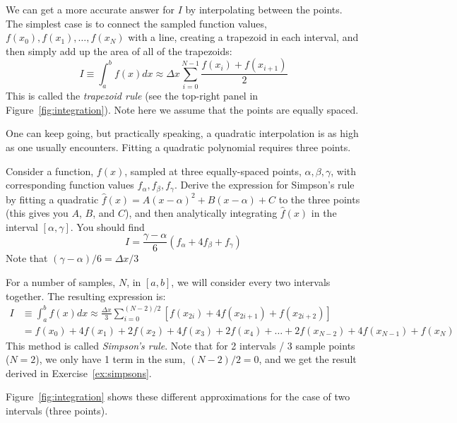 We can get a more accurate answer for $I$ by interpolating between the
points.  The simplest case is to connect the sampled function values,
$f(x_0), f(x_1), \ldots, f(x_N)$ with a line, creating a trapezoid in
each interval, and then simply add up the area of all of the
trapezoids:
\begin{equation}
I \equiv \int_a^b f(x) dx \approx
  \Delta x \sum_{i = 0}^{N-1} \frac{f(x_i) + f(x_{i+1})}{2}
\end{equation}
This is called the {\em trapezoid rule} (see the top-right panel in
Figure~\ref{fig:integration}).  Note here we assume that the points
are equally spaced.

One can keep going, but practically speaking, a quadratic interpolation
is as high as one usually encounters.  Fitting a quadratic polynomial
requires three points.

\begin{exercise}
\label{ex:simpsons}
Consider a function, $f(x)$, sampled at three equally-spaced points,
$\alpha, \beta, \gamma$, with corresponding function values $f_\alpha,
f_\beta, f_\gamma$.  Derive the expression for Simpson's rule by
fitting a quadratic $\hat{f}(x) = A(x - \alpha)^2 + B(x - \alpha) + C$
to the three points (this gives you $A$, $B$, and $C$), and then
analytically integrating $\hat{f}(x)$ in the interval
$[\alpha,\gamma]$.  You should find
\begin{equation}
I = \frac{\gamma-\alpha}{6} (f_\alpha + 4f_\beta + f_\gamma)
\end{equation}
Note that $(\gamma-\alpha)/6 = \Delta x/3$
\end{exercise}

For a number of samples, $N$, in $[a,b]$, we will
consider every two intervals together.  The resulting expression is:
\begin{align}
I &\equiv \int_a^b f(x) dx
\approx  \frac{\Delta x}{3} \sum_{i = 0}^{(N-2)/2} \left [f(x_{2i}) + 4 f(x_{2i+1}) + f(x_{2i+2}) \right ] \\
&= f(x_0) + 4f(x_1) + 2f(x_2) + 4f(x_3) + 2f(x_4) + \ldots + \nonumber 2f(x_{N-2}) + 4f(x_{N-1}) + f(x_N)
\end{align}
This method is called {\em Simpson's rule}.  Note that for 2 intervals
/ 3 sample points ($N=2$), we only have 1 term in the sum, $(N-2)/2 =
0$, and we get the result derived in Exercise~\ref{ex:simpsons}.


Figure~\ref{fig:integration} shows
these different approximations for the case of two intervals (three points).

